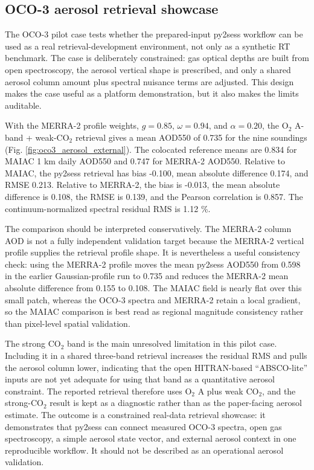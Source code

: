 \documentclass[gmd, manuscript]{copernicus}
\begin{document}
\subsection{OCO-3 aerosol retrieval showcase}

The OCO-3 pilot case tests whether the prepared-input py2sess workflow can be used as
a real retrieval-development environment, not only as a synthetic RT benchmark.  The
case is deliberately constrained: gas optical depths are built from open spectroscopy,
the aerosol vertical shape is prescribed, and only a shared aerosol column amount plus
spectral nuisance terms are adjusted.  This design makes the case useful as a platform
demonstration, but it also makes the limits auditable.

With the MERRA-2 profile weights, $g=0.85$, $\omega=0.94$, and $\alpha=0.20$, the
O$_2$ A-band + weak-CO$_2$ retrieval gives a mean AOD550 of 0.735 for the nine
soundings (Fig. \ref{fig:oco3_aerosol_external}).  The colocated reference means are
0.834 for MAIAC 1 km daily AOD550 and 0.747 for MERRA-2 AOD550.  Relative to MAIAC,
the py2sess retrieval has bias -0.100, mean absolute difference 0.174, and RMSE
0.213.  Relative to MERRA-2, the bias is -0.013, the mean absolute difference is
0.108, the RMSE is 0.139, and the Pearson correlation is 0.857.  The
continuum-normalized spectral residual RMS is 1.12 \%.

The comparison should be interpreted conservatively.  The MERRA-2 column AOD is not a
fully independent validation target because the MERRA-2 vertical profile supplies the
retrieval profile shape.  It is nevertheless a useful consistency check: using the
MERRA-2 profile moves the mean py2sess AOD550 from 0.598 in the earlier Gaussian-profile
run to 0.735 and reduces the MERRA-2 mean absolute difference from 0.155 to 0.108.
The MAIAC field is nearly flat over this small patch, whereas the OCO-3 spectra and
MERRA-2 retain a local gradient, so the MAIAC comparison is best read as regional
magnitude consistency rather than pixel-level spatial validation.

The strong CO$_2$ band is the main unresolved limitation in this pilot case.  Including
it in a shared three-band retrieval increases the residual RMS and pulls the aerosol
column lower, indicating that the open HITRAN-based ``ABSCO-lite'' inputs are not yet
adequate for using that band as a quantitative aerosol constraint.  The reported
retrieval therefore uses O$_2$ A plus weak CO$_2$, and the strong-CO$_2$ result is kept
as a diagnostic rather than as the paper-facing aerosol estimate.  The outcome is a
constrained real-data retrieval showcase: it demonstrates that py2sess can connect
measured OCO-3 spectra, open gas spectroscopy, a simple aerosol state vector, and
external aerosol context in one reproducible workflow.  It should not be described as
an operational aerosol validation.
\end{document}

